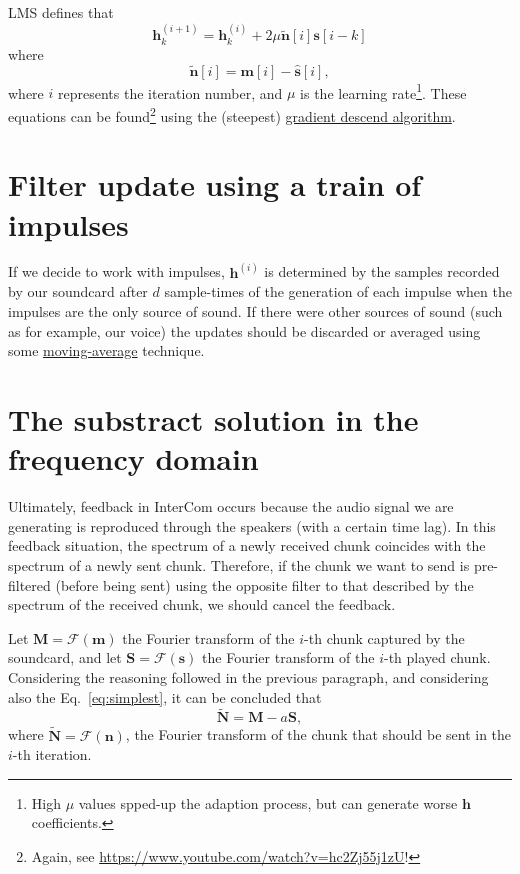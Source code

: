 LMS defines that
\begin{equation}
  {\mathbf h}^{(i+1)}_k = {\mathbf h}^{(i)}_k + 2\mu\tilde{\mathbf n}[i]{\mathbf s}[i-k] \label{eq:update}
\end{equation}
where
\begin{equation}
  \tilde{\mathbf n}[i] = {\mathbf m}[i] - \hat{\mathbf s}[i],
\end{equation}
where $i$ represents the iteration number, and $\mu$ is the learning
rate\footnote{High $\mu$ values spped-up the adaption process, but can
  generate worse $\mathbf{h}$ coefficients.}.  These equations can be
found\footnote{Again, see
  \url{https://www.youtube.com/watch?v=hc2Zj55j1zU}!} using the
(steepest)
\href{https://en.wikipedia.org/wiki/Gradient_descent}{gradient descend
  algorithm}.

\section{Filter update using a train of impulses}
If we decide to work with impulses, ${\mathbf h}^{(i)}$ is determined
by the samples recorded by our soundcard after $d$ sample-times of the
generation of each impulse when the impulses are the only source of
sound. If there were other sources of sound (such as for example, our
voice) the updates should be discarded or averaged using some
\href{https://en.wikipedia.org/wiki/Moving_average}{moving-average}
technique.

\section{The substract solution in the frequency domain}
Ultimately, feedback in InterCom occurs because the audio signal we
are generating is reproduced through the speakers (with a certain time
lag). In this feedback situation, the spectrum of a newly received
chunk coincides with the spectrum of a newly sent chunk. Therefore, if
the chunk we want to send is pre-filtered (before being sent) using
the opposite filter to that described by the spectrum of the received
chunk, we should cancel the feedback.

Let ${\mathbf M} = {\mathcal F}({\mathbf m})$ the Fourier transform of
the $i$-th chunk captured by the soundcard, and let
${\mathbf S} = {\mathcal F}({\mathbf s})$ the Fourier transform of the
$i$-th played chunk. Considering the reasoning followed in the
previous paragraph, and considering also the Eq.~\eqref{eq:simplest}, it can be concluded that
\begin{equation}
  \tilde{\mathbf N} = {\mathbf M} - a{\mathbf S},
  \label{eq:simplest_fourier}
\end{equation}
where $\tilde{\mathbf N} = {\mathcal F}({\mathbf n})$, the Fourier
transform of the chunk that should be sent in the $i$-th iteration.

